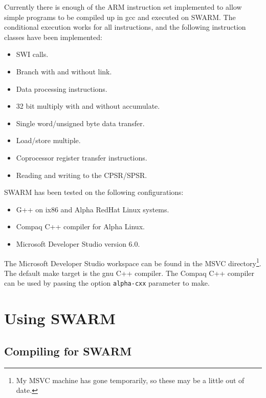 \documentclass[10pt,a4paper]{article}
\begin{document}
Currently there is enough of the ARM instruction set implemented to
allow simple programs to be compiled up in gcc and executed on
SWARM. The conditional execution works for all instructions, and the
following instruction classes have been implemented:

\begin{itemize}
\itemsep 0pt
\parsep 0pt
\item SWI calls.
\item Branch with and without link.
\item Data processing instructions.
\item 32 bit multiply with and without accumulate.
\item Single word/unsigned byte data transfer.
\item Load/store multiple.
\item Coprocessor register transfer instructions.
\item Reading and writing to the CPSR/SPSR.
\end{itemize}

SWARM has been tested on the following configurations:

\begin{itemize}
\itemsep 0pt
\parsep 0pt
\item G++ on ix86 and Alpha RedHat Linux systems.
\item Compaq C++ compiler for Alpha Linux.
\item Microsoft Developer Studio version 6.0.
\end{itemize}

The Microsoft Developer Studio workspace can be found in the MSVC
directory\footnote{My MSVC machine has gone temporarily, so these may
be a little out of date.}. The default make target is the gnu C++
compiler. The Compaq
C++ compiler can be used by passing the option \texttt{alpha-cxx}
parameter to make. 

\section{Using SWARM} %
\label{sec:using}     %

\subsection{Compiling for SWARM} %
\label{sec:compiling}            %
\end{document}
